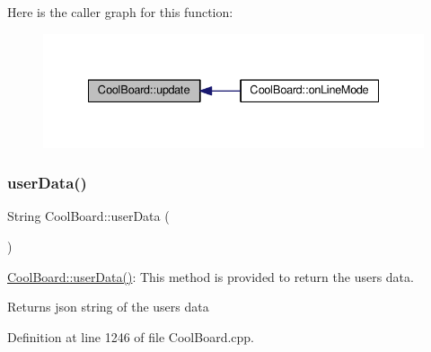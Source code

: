 Here is the caller graph for this function\+:
\nopagebreak
\begin{figure}[H]
\begin{center}
\leavevmode
\includegraphics[width=335pt]{d7/df9/class_cool_board_a8612756d3f73198cdde857a66f0fe690_icgraph}
\end{center}
\end{figure}
\mbox{\label{class_cool_board_ae7358fb6e623cfc81b775f5f1734909b}} 
\subsubsection{\texorpdfstring{user\+Data()}{userData()}}
{\footnotesize\ttfamily String Cool\+Board\+::user\+Data (\begin{DoxyParamCaption}{ }\end{DoxyParamCaption})}

\hyperlink{class_cool_board_ae7358fb6e623cfc81b775f5f1734909b}{Cool\+Board\+::user\+Data()}\+: This method is provided to return the user\textquotesingle{}s data.

\begin{DoxyReturn}{Returns}
json string of the user\textquotesingle{}s data 
\end{DoxyReturn}


Definition at line 1246 of file Cool\+Board.\+cpp.


